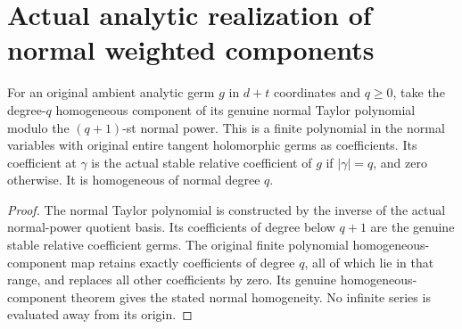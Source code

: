 \section{Actual analytic realization of normal weighted components}

\begin{definition}
\label{hir:actual-normal-homogeneous-polynomial}
\leanok
For an original ambient analytic germ $g$ in $d+t$ coordinates and
$q\ge0$, take the degree-$q$ homogeneous component of its genuine
normal Taylor polynomial modulo the $(q+1)$-st normal power. This is a
finite polynomial in the normal variables with original entire tangent
holomorphic germs as coefficients. Its coefficient at $\gamma$ is the
actual stable relative coefficient of $g$ if $|\gamma|=q$, and zero
otherwise. It is homogeneous of normal degree $q$.
\end{definition}
\begin{proof}
The normal Taylor polynomial is constructed by the inverse of the
actual normal-power quotient basis. Its coefficients of degree below
$q+1$ are the genuine stable relative coefficient germs. The original
finite polynomial homogeneous-component map retains exactly coefficients
of degree $q$, all of which lie in that range, and replaces all other
coefficients by zero. Its genuine homogeneous-component theorem gives
the stated normal homogeneity. No infinite series is evaluated away
from its origin.
\end{proof}

